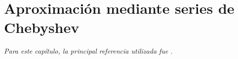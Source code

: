 \chapter[Polinomios de Chebyshev]{Aproximación mediante series de Chebyshev}


	



	
\emph{Para este capítulo, la principal referencia utilizada fue \textcite{Hassani2013}.}